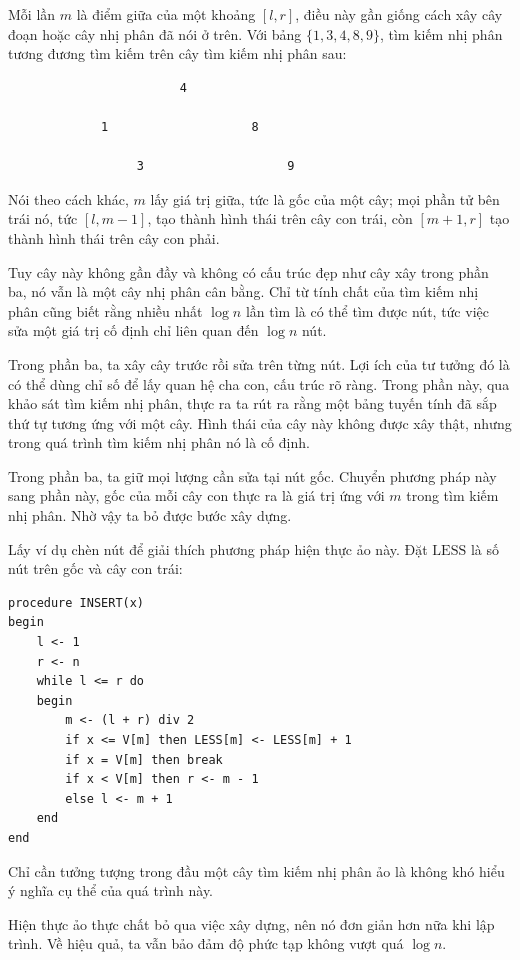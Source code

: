 \documentclass[11pt]{article}
\begin{document}
Mỗi lần \(m\) là điểm giữa của một khoảng \([l,r]\), điều này gần giống cách
xây cây đoạn hoặc cây nhị phân đã nói ở trên. Với bảng \(\{1,3,4,8,9\}\),
tìm kiếm nhị phân tương đương tìm kiếm trên cây tìm kiếm nhị phân sau:

\begin{verbatim}
                        4

             1                    8

                  3                    9
\end{verbatim}

Nói theo cách khác, \(m\) lấy giá trị giữa, tức là gốc của một cây; mọi phần
tử bên trái nó, tức \([l,m-1]\), tạo thành hình thái trên cây con trái, còn
\([m+1,r]\) tạo thành hình thái trên cây con phải.

Tuy cây này không gần đầy và không có cấu trúc đẹp như cây xây trong phần ba,
nó vẫn là một cây nhị phân cân bằng. Chỉ từ tính chất của tìm kiếm nhị phân
cũng biết rằng nhiều nhất \(\log n\) lần tìm là có thể tìm được nút, tức việc
sửa một giá trị cố định chỉ liên quan đến \(\log n\) nút.

Trong phần ba, ta xây cây trước rồi sửa trên từng nút. Lợi ích của tư tưởng
đó là có thể dùng chỉ số để lấy quan hệ cha con, cấu trúc rõ ràng. Trong phần
này, qua khảo sát tìm kiếm nhị phân, thực ra ta rút ra rằng một bảng tuyến
tính đã sắp thứ tự tương ứng với một cây. Hình thái của cây này không được xây
thật, nhưng trong quá trình tìm kiếm nhị phân nó là cố định.

Trong phần ba, ta giữ mọi lượng cần sửa tại nút gốc. Chuyển phương pháp này
sang phần này, gốc của mỗi cây con thực ra là giá trị ứng với \(m\) trong tìm
kiếm nhị phân. Nhờ vậy ta bỏ được bước xây dựng.

Lấy ví dụ chèn nút để giải thích phương pháp hiện thực ảo này. Đặt
\(\mathrm{LESS}\) là số nút trên gốc và cây con trái:

\begin{verbatim}
procedure INSERT(x)
begin
    l <- 1
    r <- n
    while l <= r do
    begin
        m <- (l + r) div 2
        if x <= V[m] then LESS[m] <- LESS[m] + 1
        if x = V[m] then break
        if x < V[m] then r <- m - 1
        else l <- m + 1
    end
end
\end{verbatim}

Chỉ cần tưởng tượng trong đầu một cây tìm kiếm nhị phân ảo là không khó hiểu ý
nghĩa cụ thể của quá trình này.

Hiện thực ảo thực chất bỏ qua việc xây dựng, nên nó đơn giản hơn nữa khi lập
trình. Về hiệu quả, ta vẫn bảo đảm độ phức tạp không vượt quá \(\log n\).
\end{document}

